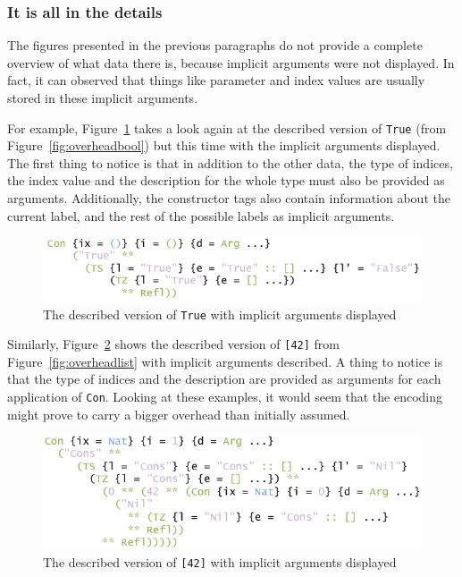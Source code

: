 \documentclass{ituthesis}
\newcommand{\ttconstructor}[1]{\textcolor{constructor-color}{\texttt{#1}}}
\newcommand{\ttliteral}[1]{\textcolor{literal-color}{\texttt{#1}}}
\theoremstyle{break}
\begin{document}
\subsubsection{It is all in the details}
\label{ssub:Itisallinthedetails}
The figures presented in the previous paragraphs do not provide a complete overview of what data there is, because implicit arguments were not displayed.
In fact, it can observed that things like parameter and index values are usually stored in these implicit arguments.

For example, Figure~\ref{fig:overheadboolimpl} takes a look again at the described version of \ttconstructor{True} (from Figure~\ref{fig:overheadbool}) but this time with the implicit arguments displayed.
The first thing to notice is that in addition to the other data, the type of indices, the index value and the description for the whole type must also be provided as arguments.
Additionally, the constructor tags also contain information about the current label, and the rest of the possible labels as implicit arguments.

\begin{figure}[ht]
\begin{center}
    \includegraphics[scale=0.5]{Figures/GenericsOverheadBoolImpl.png}
\end{center}
\caption{The described version of \ttconstructor{True} with implicit arguments displayed}
\label{fig:overheadboolimpl}
\end{figure}

Similarly, Figure~\ref{fig:overheadlistimpl} shows the described version of \ttconstructor{[}\ttliteral{42}\ttconstructor{]} from Figure~\ref{fig:overheadlist} with implicit arguments described.
A thing to notice is that the type of indices and the description are provided as arguments for each application of \ttconstructor{Con}.
Looking at these examples, it would seem that the encoding might prove to carry a bigger overhead than initially assumed.

\begin{figure}[ht]
\begin{center}
    \includegraphics[scale=0.5]{Figures/GenericsOverheadListImpl.png}
\end{center}
\caption{The described version of \ttconstructor{[}\ttliteral{42}\ttconstructor{]} with implicit arguments displayed}
\label{fig:overheadlistimpl}
\end{figure}
\end{document}
